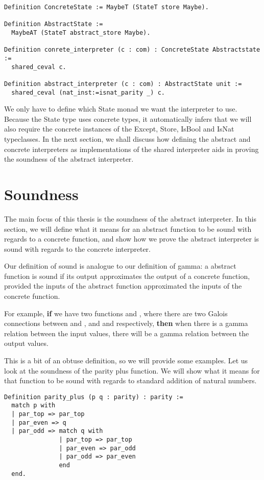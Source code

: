 {\begin{verbatim}
Definition ConcreteState := MaybeT (StateT store Maybe).

Definition AbstractState := 
  MaybeAT (StateT abstract_store Maybe).

Definition conrete_interpreter (c : com) : ConcreteState Abstractstate :=
  shared_ceval c.

Definition abstract_interpreter (c : com) : AbstractState unit :=
  shared_ceval (nat_inst:=isnat_parity _) c.
\end{verbatim}

We only have to define which State monad we want the interpreter to use.
Because the State type uses concrete types, it automatically infers that we
will also require the concrete instances of the Except, Store, IsBool and IsNat
typeclasses. In the next section, we shall discuss how defining the abstract
and concrete interpreters as implementations of the shared interpreter aids in
proving the soundness of the abstract interpreter.

\section{Soundness}\label{sec:soundness}
The main focus of this thesis is the soundness of the abstract interpreter. In
this section, we will define what it means for an abstract function to be sound
with regards to a concrete function, and show how we prove the abstract 
interpreter is sound with regards to the concrete interpreter. 

Our definition of sound is analogue to our definition of gamma: a abstract 
function is sound if its output approximates the output of a concrete function,
provided the inputs of the abstract function approximated the inputs of the
concrete function.

For example, \textbf{if} we have two functions  and , where there are two Galois connections 
between  and , and  and  respectively, 
\textbf{then} when 
there is a gamma relation between the input values, there will be a gamma
relation between the output values.

This is a bit of an obtuse definition, so we will provide some examples. Let us
look at the soundness of the parity plus function. We will show what it
means for that function to be sound with regards to standard addition of
natural numbers.

\begin{verbatim}
Definition parity_plus (p q : parity) : parity :=
  match p with 
  | par_top => par_top
  | par_even => q
  | par_odd => match q with
               | par_top => par_top
               | par_even => par_odd
               | par_odd => par_even
               end
  end.
\end{verbatim}

}
